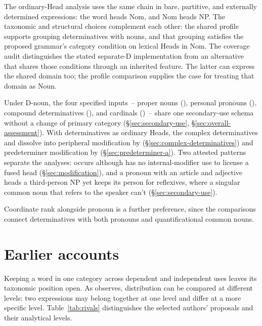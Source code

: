 \documentclass[12pt]{article}
\begin{document}
The ordinary-Head analysis uses the same chain in bare, partitive, and externally determined expressions: the word heads Nom, and Nom heads NP. The taxonomic and structural choices complement each other: the shared profile supports grouping determinatives with nouns, and that grouping satisfies the proposed grammar's category condition on lexical Heads in Nom. The coverage audit distinguishes the stated separate-D implementation from an alternative that shares those conditions through an inherited feature. The latter can express the shared domain too; the profile comparison supplies the case for treating that domain as Noun.

Under D-noun, the four specified inputs~-- proper nouns (), personal pronouns (), compound determinatives (), and cardinals ()~-- share one secondary-use schema without a change of primary category (§\ref{sec:secondary-use}, §\ref{sec:overall-assessment}). With determinatives as ordinary Heads, the complex determinatives  and  dissolve into peripheral modification by  (§\ref{sec:complex-determinatives}) and predeterminer modification by  (§\ref{sec:predeterminer-a}). Two attested patterns separate the analyses:  occurs although  has no internal-modifier use to license a fused head (§\ref{sec:modification}), and a pronoun with an article and adjective heads a third-person NP yet keeps its person for reflexives, where a singular common noun that refers to the speaker can't (§\ref{sec:secondary-use}).

Coordinate rank alongside pronoun is a further preference, since the comparisons connect determinatives with both pronouns and quantificational common nouns.

\appendix

\section{Earlier accounts}\label{sec:historical}

Keeping a word in one category across dependent and independent uses leaves its taxonomic position open. As \textcite[232--235]{lyons1968} observes, distribution can be compared at different levels: two expressions may belong together at one level and differ at a more specific level. Table~\ref{tab:rivals} distinguishes the selected authors' proposals and their analytical levels.
\end{document}
